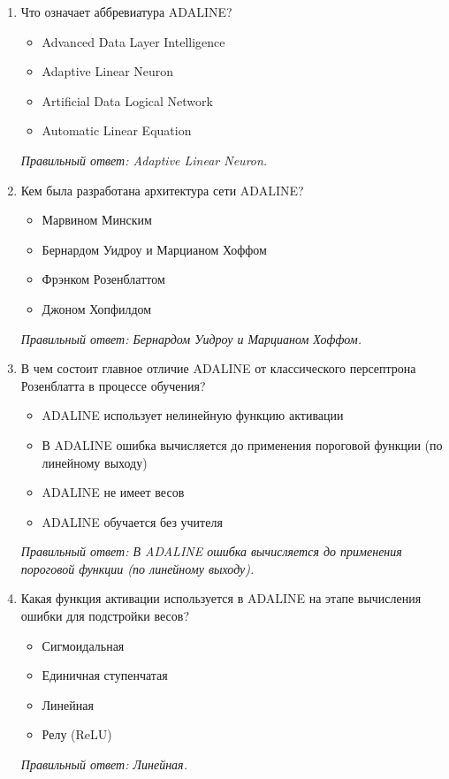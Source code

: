 \small
\begin{enumerate}[label=\textbf{\arabic*.}, leftmargin=0pt, itemsep=1.2em]
\item Что означает аббревиатура ADALINE?
\begin{itemize}[label=$\square$, leftmargin=1.5cm, itemsep=0.2em, topsep=0.3em]
\item Advanced Data Layer Intelligence
\item Adaptive Linear Neuron
\item Artificial Data Logical Network
\item Automatic Linear Equation
\end{itemize}
{\small\textit{Правильный ответ: Adaptive Linear Neuron.}}

\item Кем была разработана архитектура сети ADALINE?
\begin{itemize}[label=$\square$, leftmargin=1.5cm, itemsep=0.2em, topsep=0.3em]
\item Марвином Минским
\item Бернардом Уидроу и Марцианом Хоффом
\item Фрэнком Розенблаттом
\item Джоном Хопфилдом
\end{itemize}
{\small\textit{Правильный ответ: Бернардом Уидроу и Марцианом Хоффом.}}

\item В чем состоит главное отличие ADALINE от классического персептрона Розенблатта в процессе обучения?
\begin{itemize}[label=$\square$, leftmargin=1.5cm, itemsep=0.2em, topsep=0.3em]
\item ADALINE использует нелинейную функцию активации
\item В ADALINE ошибка вычисляется до применения пороговой функции (по линейному выходу)
\item ADALINE не имеет весов
\item ADALINE обучается без учителя
\end{itemize}
{\small\textit{Правильный ответ: В ADALINE ошибка вычисляется до применения пороговой функции (по линейному выходу).}}

\item Какая функция активации используется в ADALINE на этапе вычисления ошибки для подстройки весов?
\begin{itemize}[label=$\square$, leftmargin=1.5cm, itemsep=0.2em, topsep=0.3em]
\item Сигмоидальная
\item Единичная ступенчатая
\item Линейная
\item Релу (ReLU)
\end{itemize}
{\small\textit{Правильный ответ: Линейная.}}


\end{enumerate}
